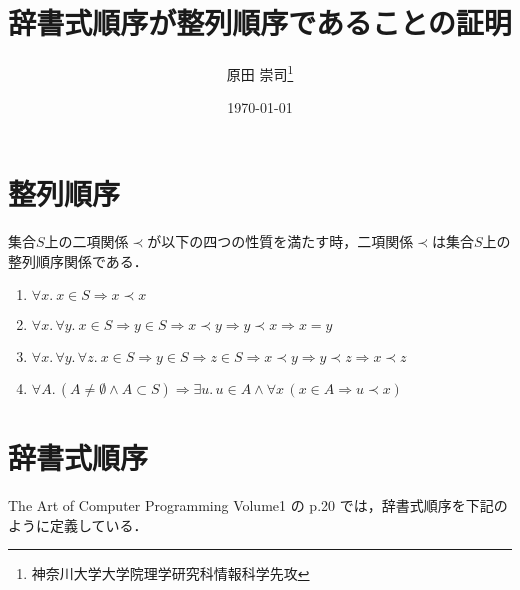 \documentclass[11pt,dvipdfmx]{jarticle}
\title{辞書式順序が整列順序であることの証明}
\author{原田 崇司\if0\thanks{神奈川大学大学院理学研究科情報科学先攻}\fi}
\date{\today}
\theoremstyle{definition}
\begin{document}
\maketitle
\thispagestyle{empty}

\section{整列順序}
集合$S$上の二項関係$\prec$が以下の四つの性質を満たす時，二項関係$\prec$は集合$S$上の整列順序関係である．
\begin{enumerate}
 \item $\forall x. \ x \in S \Rightarrow x \prec x$
 \item $\forall x. \, \forall y. \ x \in S \Rightarrow y \in S \Rightarrow x \prec y \Rightarrow y \prec x \Rightarrow x = y$
 \item $\forall x. \, \forall y. \, \forall z. \ x \in S \Rightarrow y \in S \Rightarrow z \in S \Rightarrow x \prec y \Rightarrow y \prec z \Rightarrow x \prec z$
 \item $\forall A. \, (A \neq \emptyset \land A \subset S) \Rightarrow \exists u. \, u \in A \land \forall x \, (x \in A \Rightarrow u \prec x)$
\end{enumerate}

\section{辞書式順序}
The Art of Computer Programming Volume1 の p.20 では，辞書式順序を下記のように定義している．
\end{document}

